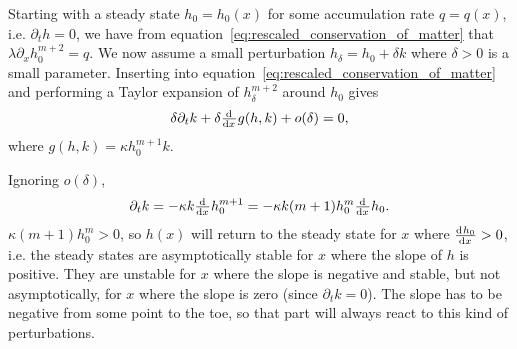 Starting with a steady state $h_0 = h_0(x)$ for some accumulation rate $q = q(x)$, i.e. $\partial_t h = 0$, we have from equation~\eqref{eq:rescaled_conservation_of_matter} that $\lambda \partial_x h_0^{m+2} = q$. We now assume a small perturbation $h_\delta = h_0 + \delta k$ where $\delta > 0$ is a small parameter. Inserting into equation~\eqref{eq:rescaled_conservation_of_matter} and performing a Taylor expansion of $h_\delta^{m+2}$ around $h_0$ gives
%
\begin{equation}
    \delta \partial_t k + \delta \od{}{x} g(h,k) + o(\delta) = 0,
    \label{eq:rescaled_conservation_of_matter_perturbation}
\end{equation}
where $g(h,k) = \kappa h_0^{m+1} k$.

Ignoring $o(\delta)$,
%
\begin{equation}
    \partial_t k = - \kappa k \od{}{x} h_0^{m+1} = - \kappa k (m+1) h_0^m \od{}{x} h_0.
\end{equation}
%
$\kappa (m+1) h_0^m > 0$, so $h(x)$ will return to the steady state for $x$ where $\od{h_0}{x} > 0$, i.e. the steady states are asymptotically stable for $x$ where the slope of $h$ is positive. They are unstable for $x$ where the slope is negative and stable, but not asymptotically, for $x$ where the slope is zero (since $\partial_t k = 0$). The slope has to be negative from some point to the toe, so that part will always react to this kind of perturbations.
